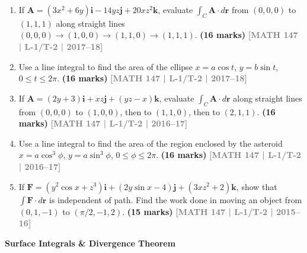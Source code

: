 \documentclass[12pt,a3paper]{article}
\newcommand{\yr}[1]{\hfill\textcolor{gray}{\small\textbf{[#1]}}}
\newcommand{\mk}[1]{\textcolor{orange!70!black}{\small\textbf{(#1 marks)}}}
\newcommand{\subtopic}[2]{%
  \vspace{10pt}
  \noindent\begin{tcolorbox}[colback=#1!8,colframe=#1,boxrule=0.6pt,arc=4pt,
    left=6pt,right=6pt,top=4pt,bottom=4pt]
    \small\bfseries\textcolor{#1}{#2}
  \end{tcolorbox}
  \vspace{2pt}
}
\begin{document}
\begin{enumerate}
\item If $\mathbf{A}=(3x^{2}+6y)\mathbf{i}-14yz\mathbf{j}+20xz^{2}\mathbf{k}$, evaluate $\int_{C}\mathbf{A}\cdot d\mathbf{r}$ from $(0,0,0)$ to $(1,1,1)$ along straight lines $(0,0,0)\to(1,0,0)\to(1,1,0)\to(1,1,1)$.
\mk{16} \yr{MATH 147 | L-1/T-2 | 2017--18}


\item Use a line integral to find the area of the ellipse $x=a\cos t$, $y=b\sin t$, $0\le t\le 2\pi$.
\mk{16} \yr{MATH 147 | L-1/T-2 | 2017--18}


\item If $\mathbf{A}=(2y+3)\mathbf{i}+xz\mathbf{j}+(yz-x)\mathbf{k}$, evaluate $\int_{C}\mathbf{A}\cdot d\mathbf{r}$ along straight lines from $(0,0,0)$ to $(1,0,0)$, then to $(1,1,0)$, then to $(2,1,1)$.
\mk{16} \yr{MATH 147 | L-1/T-2 | 2016--17}


\item Use a line integral to find the area of the region enclosed by the asteroid $x=a\cos^{3}\phi$, $y=a\sin^{3}\phi$, $0\le\phi\le 2\pi$.
\mk{16} \yr{MATH 147 | L-1/T-2 | 2016--17}


\item If $\mathbf{F}=(y^{2}\cos x+z^{3})\mathbf{i}+(2y\sin x-4)\mathbf{j}+(3xz^{2}+2)\mathbf{k}$, show that $\int\mathbf{F}\cdot d\mathbf{r}$ is independent of path. Find the work done in moving an object from $(0,1,-1)$ to $(\pi/2,-1,2)$.
\mk{15} \yr{MATH 147 | L-1/T-2 | 2015--16}


\end{enumerate}

\subtopic{cD}{Surface Integrals \& Divergence Theorem}
\label{sub:s4-surface}
\end{document}
